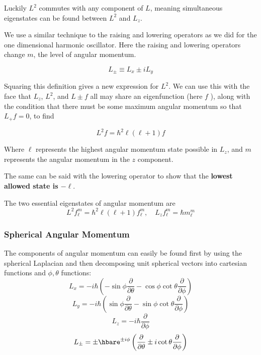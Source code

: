 Luckily $ L^2 $ commutes with any component of $ L $, meaning simultaneous eigenstates can be found between $ L^2 $ and $ L_{z} $. 

We use a similar technique to the raising and lowering operators as we did for the one dimensional harmonic oscillator. Here the raising and lowering operators change $ m $, the level of angular momentum.

\begin{equation}
  L_{\pm}\equiv L_{x}\pm i L_{y}
\end{equation}

Squaring this definition gives a new expression for $ L^2 $. We can use this with the face that $ L_{z} $, $ L^2 $, and $ L\pm f $ all may share an eigenfunction (here $ f $ ), along with the condition that there must be some maximum angular momentum so that $ L_{+}f=0 $, to find

\begin{equation}
  L^2f=\hbar^2\ell(\ell+1)f
\end{equation}

Where $ \ell $ represents the highest angular momentum state possible in $L_{z}$, and $m $ represents the angular momentum in the $ z $ component.

The same can be said with the lowering operator to show that the \textbf{lowest allowed state is $ -\ell $}.

The two essential eigenstates of angular momentum are
\begin{equation}
  L^2f_{\ell}^{m}=\hbar^2\ell(\ell+1)f_{\ell}^{m},\quad L_{z}f_{\ell}^{m}=\hbar m_{\ell}^{m}
\end{equation}

\subsubsection{Spherical Angular Momentum}
The components of angular momentum can easily be found first by using the spherical Laplacian and then decomposing unit spherical vectors into cartesian functions and $ \phi,\theta $ functions:
\begin{equation}
  L_{x}=-i \hbar\left(-\sin \phi \frac{\partial}{\partial \theta}-\cos \phi \cot \theta \frac{\partial}{\partial \phi}\right)
\end{equation}
\begin{equation}
  L_{y}=-i \hbar\left(\sin \phi \frac{\partial}{\partial \theta}-\sin\phi \cot \theta \frac{\partial}{\partial \phi}\right)
\end{equation}
\begin{equation}
  L_{z}=-i\hbar \frac{\partial}{\partial \phi}
\end{equation}
\begin{equation}
  L_{\pm}=\pm\hbare^{\pm i \phi}\left(\frac{\partial}{\partial \theta}\pm i\cot \theta \frac{\partial}{\partial \phi}\right)
\end{equation}

